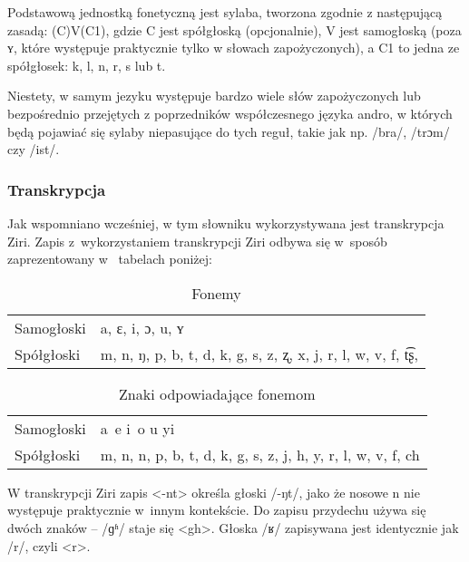 \begin{spacing}{1.1}
Podstawową jednostką fonetyczną jest sylaba, tworzona zgodnie z następującą
zasadą: (C)V(C1), gdzie C jest spółgłoską (opcjonalnie), V jest samogłoską (poza
ʏ, które występuje praktycznie tylko w słowach zapożyczonych), a C1 to jedna
ze spółgłosek: k, l, n, r, s lub t.

Niestety, w samym jezyku występuje bardzo wiele słów zapożyczonych lub bezpośrednio
przejętych z poprzedników współczesnego języka andro, w których będą pojawiać
się sylaby niepasujące do tych reguł, takie jak np. /bra/, /trɔm/ czy /ist/.

\subsubsection{Transkrypcja}

Jak wspomniano wcześniej, w tym słowniku wykorzystywana jest transkrypcja Ziri. 
Zapis z~wykorzystaniem transkrypcji Ziri odbywa się w~sposób zaprezentowany w~
tabelach poniżej:

\begin{table}[h]
	\centering
	\caption{Fonemy}
	\begin{tabular}{ll} \toprule
		Samogłoski & a, ɛ, i, ɔ, u, ʏ \\
		Spółgłoski & m, n, ŋ, p, b, t, d, k, g, s, z, ʐ, x, j, r, l, w, v, f, t͡ʂ, \\\bottomrule
	\end{tabular}
	\label{tab:phonemes}
\end{table}

\begin{table}[h]
\centering
\caption{Znaki odpowiadające fonemom}
\begin{tabular}{ll} \toprule
	Samogłoski & a~e i~o u yi \\
	Spółgłoski & m, n, n, p, b, t, d, k, g, s, z, j, h, y, r, l, w, v, f, ch \\\bottomrule
\end{tabular}
\label{tab:chars}
\end{table}

W transkrypcji Ziri zapis <-nt> określa głoski /-ŋt/, jako że nosowe n nie 
występuje praktycznie w~innym kontekście. Do zapisu przydechu używa się dwóch 
znaków -- /ɡʱ/ staje się <gh>. Głoska /ʁ/ zapisywana jest identycznie jak /r/, 
czyli <r>.

\skipline


\end{spacing}
